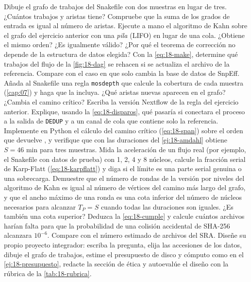 \begin{ejercicios}
 Dibuje el grafo de trabajos del Snakefile con dos muestras en lugar de tres. ¿Cuántos trabajos y aristas tiene? Compruebe que la suma de los grados de entrada es igual al número de aristas.
 Ejecute a mano el algoritmo de Kahn sobre el grafo del ejercicio anterior con una \emph{pila} (LIFO) en lugar de una cola. ¿Obtiene el mismo orden? ¿Es igualmente válido? ¿Por qué el teorema de corrección no depende de la estructura de datos elegida?
 Con la \cref{eq:18-make}, determine qué trabajos del flujo de la \cref{fig:18-dag} se rehacen si se actualiza el archivo de la referencia. Compare con el caso en que solo cambia la base de datos de SnpEff.
 Añada al Snakefile una regla \texttt{mosdepth} que calcule la cobertura de cada muestra (\cref{cap:07}) y haga que  la incluya. ¿Qué aristas nuevas aparecen en el grafo? ¿Cambia el camino crítico?
 Escriba la versión Nextflow de la regla del ejercicio anterior. Explique, usando la \cref{eq:18-disparos}, qué pasaría si conectara el proceso a la salida de \texttt{DEDUP} y a un canal de cola que contiene solo la referencia.
 Implemente en Python el cálculo del camino crítico (\cref{eq:18-span}) sobre el orden que devuelve , y verifique que con las duraciones del \cref{ej:18-amdahl} obtiene $S=46$ min para tres muestras.
 Mida la aceleración de un flujo real (por ejemplo, el Snakefile con datos de prueba) con 1, 2, 4 y 8 núcleos, calcule la fracción serial de Karp-Flatt (\cref{eq:18-karpflatt}) y diga si el límite es una parte serial genuina o una sobrecarga.
 Demuestre que el número de rondas de la versión por niveles del algoritmo de Kahn es igual al número de vértices del camino más largo del grafo, y que el ancho máximo de una ronda es una cota inferior del número de núcleos necesarios para alcanzar $T_P=S$ cuando todas las duraciones son iguales. ¿Es también una cota superior?
 Deduzca la \cref{eq:18-cumple} y calcule cuántos archivos harían falta para que la probabilidad de una colisión accidental de SHA-256 alcanzara $10^{-6}$. Compare con el número estimado de archivos del SRA.
 Diseñe su propio proyecto integrador: escriba la pregunta, elija las accesiones de los datos, dibuje el grafo de trabajos, estime el presupuesto de disco y cómputo como en el \cref{ej:18-presupuesto}, redacte la sección de ética y autoevalúe el diseño con la rúbrica de la \cref{tab:18-rubrica}.
\end{ejercicios}

